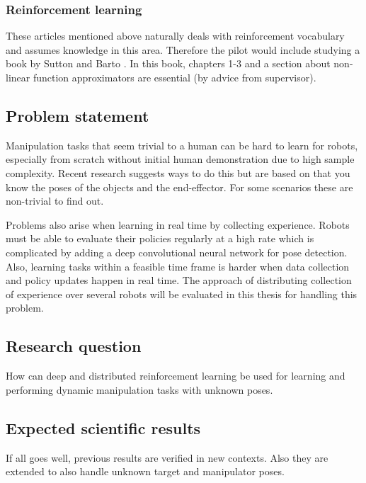 \subsubsection{Reinforcement learning}

These articles mentioned above naturally deals with reinforcement vocabulary
and assumes knowledge in this area. Therefore the pilot would include studying
a book by Sutton and Barto \cite{sutton1998reinforcement}. In this book,
chapters 1-3 and a section about non-linear function approximators are
essential (by advice from supervisor).

\subsection{Problem statement}

Manipulation tasks that seem trivial to a human can be hard to learn for
robots, especially from scratch without initial human demonstration due to high
sample complexity. Recent research suggests ways to do this but are based on
that you know the poses of the objects and the end-effector. For some scenarios
these are non-trivial to find out.

Problems also arise when learning in real time by collecting experience. Robots
must be able to evaluate their policies regularly at a high rate which is
complicated by adding a deep convolutional neural network for pose detection.
Also, learning tasks within a feasible time frame is harder when data
collection and policy updates happen in real time. The approach of
distributing collection of experience over several robots will be evaluated in
this thesis for handling this problem.

\subsection{Research question}

How can deep and distributed reinforcement learning be used for learning and
performing dynamic manipulation tasks with unknown poses.

\subsection{Expected scientific results}

If all goes well, previous results are verified in new contexts. Also
they are extended to also handle unknown target and manipulator poses.
